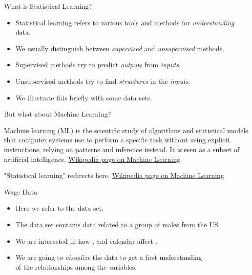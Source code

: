 \documentclass[mathserif, aspectratio=169]{beamer}
\begin{document}
\begin{frame}{What is Statistical Learning?}
	\begin{itemize}
		\item Statistical learning refers to various tools and methods for \emph{understanding} data.
		\item We usually distinguish between \emph{supervised} and \emph{unsupervised} methods.
		\item Supervised methods try to predict \emph{outputs} from \emph{inputs}.
		\item Unsupervised methods try to find \emph{structures} in the \emph{inputs}.
		\item We illustrate this briefly with some data sets.
	\end{itemize}
\end{frame}

\begin{frame}{But what about Machine Learning?}
	\begin{Quote}%
		{Machine learning (ML) is the scientific study of algorithms and
		statistical models that computer systems use to perform a specific task
		without using explicit instructions, relying on patterns and inference
		instead. It is seen as a subset of artificial intelligence.}%
		{\href{https://en.wikipedia.org/wiki/Machine_learning}{Wikipedia page on Machine Learning}}
	\end{Quote}
	\begin{Quote}%
		{"Statistical learning" redirects here.}%
		{\href{https://en.wikipedia.org/wiki/Machine_learning}{Wikipedia page on Machine Learning}}
	\end{Quote}
\end{frame}

\begin{frame}{Wage Data}
	\begin{itemize}
		\item Here we refer to the  data set.
		\item The  data set contains data related to a group of males from the US.
		\item We are interested in how ,  and
			calendar  affect .
		\item We are going to \emph{visualize} the data to get a first understanding\\
			of the relationships among the variables.
	\end{itemize}
\end{frame}
\end{document}
